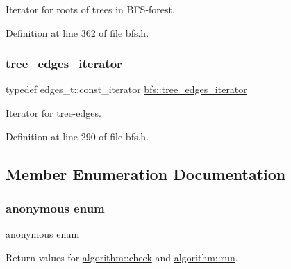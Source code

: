 Iterator for roots of trees in B\+F\+S-\/forest. 



Definition at line 362 of file bfs.\+h.

\mbox{\label{classbfs_a04e608fe18089e5495cadb995aa75261}} 
\subsubsection{\texorpdfstring{tree\+\_\+edges\+\_\+iterator}{tree\_edges\_iterator}}
{\footnotesize\ttfamily typedef edges\+\_\+t\+::const\+\_\+iterator \mbox{\hyperlink{classbfs_a04e608fe18089e5495cadb995aa75261}{bfs\+::tree\+\_\+edges\+\_\+iterator}}\hspace{0.3cm}{\ttfamily [inherited]}}



Iterator for tree-\/edges. 



Definition at line 290 of file bfs.\+h.



\subsection{Member Enumeration Documentation}
\mbox{\label{classalgorithm_af1a0078e153aa99c24f9bdf0d97f6710}} 
\subsubsection{\texorpdfstring{anonymous enum}{anonymous enum}}
{\footnotesize\ttfamily anonymous enum\hspace{0.3cm}{\ttfamily [inherited]}}



Return values for \mbox{\hyperlink{classalgorithm_a76361fb03ad1cf643affc51821e43bed}{algorithm\+::check}} and \mbox{\hyperlink{classalgorithm_a734b189509a8d6b56b65f8ff772d43ca}{algorithm\+::run}}. 


